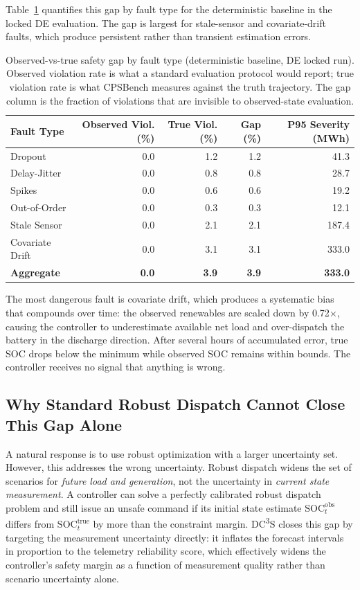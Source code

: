 \documentclass[11pt,a4paper]{article}
\begin{document}
Table~\ref{tab:safety_gap_by_fault} quantifies this gap by fault type for the deterministic baseline in the locked DE evaluation. The gap is largest for stale-sensor and covariate-drift faults, which produce persistent rather than transient estimation errors.

\begin{table}[htbp]
\centering\small
\caption{Observed-vs-true safety gap by fault type (deterministic baseline, DE locked run). Observed violation rate is what a standard evaluation protocol would report; true violation rate is what CPSBench measures against the truth trajectory. The gap column is the fraction of violations that are invisible to observed-state evaluation.}
\label{tab:safety_gap_by_fault}
\begin{tabular}{lrrrr}
\toprule
Fault Type & Observed Viol. (\%) & True Viol. (\%) & Gap (\%) & P95 Severity (MWh) \\
\midrule
Dropout & 0.0 & 1.2 & 1.2 & 41.3 \\
Delay-Jitter & 0.0 & 0.8 & 0.8 & 28.7 \\
Spikes & 0.0 & 0.6 & 0.6 & 19.2 \\
Out-of-Order & 0.0 & 0.3 & 0.3 & 12.1 \\
Stale Sensor & 0.0 & 2.1 & 2.1 & 187.4 \\
Covariate Drift & 0.0 & 3.1 & 3.1 & 333.0 \\
\midrule
\textbf{Aggregate} & \textbf{0.0} & \textbf{3.9} & \textbf{3.9} & \textbf{333.0} \\
\bottomrule
\end{tabular}
\end{table}

The most dangerous fault is covariate drift, which produces a systematic bias that compounds over time: the observed renewables are scaled down by 0.72$\times$, causing the controller to underestimate available net load and over-dispatch the battery in the discharge direction. After several hours of accumulated error, true SOC drops below the minimum while observed SOC remains within bounds. The controller receives no signal that anything is wrong.

\subsection{Why Standard Robust Dispatch Cannot Close This Gap Alone}

A natural response is to use robust optimization with a larger uncertainty set. However, this addresses the wrong uncertainty. Robust dispatch widens the set of scenarios for \emph{future load and generation}, not the uncertainty in \emph{current state measurement}. A controller can solve a perfectly calibrated robust dispatch problem and still issue an unsafe command if its initial state estimate $\mathrm{SOC}_t^{\mathrm{obs}}$ differs from $\mathrm{SOC}_t^{\mathrm{true}}$ by more than the constraint margin. DC\textsuperscript{3}S closes this gap by targeting the measurement uncertainty directly: it inflates the forecast intervals in proportion to the telemetry reliability score, which effectively widens the controller's safety margin as a function of measurement quality rather than scenario uncertainty alone.
\end{document}

